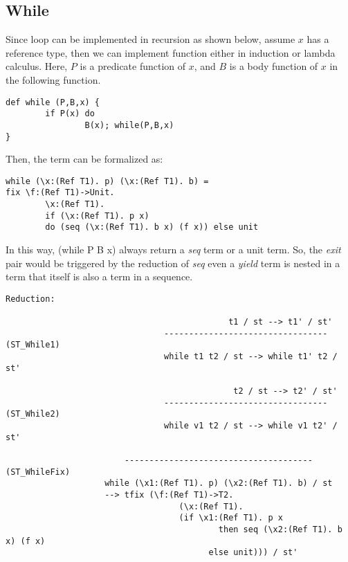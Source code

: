 \subsection{While}
Since \while loop can be implemented in recursion as shown below, assume $x$ has a reference type, then we can implement \while function either in induction or lambda calculus. Here, $P$ is a predicate function of $x$, and $B$ is a body function of $x$ in the following function.
\begin{lstlisting}
def while (P,B,x) {
		if P(x) do
				B(x); while(P,B,x)
}
\end{lstlisting}
Then, the \while term can be formalized as:
\begin{lstlisting}
while (\x:(Ref T1). p) (\x:(Ref T1). b) =
fix \f:(Ref T1)->Unit. 
		\x:(Ref T1). 
		if (\x:(Ref T1). p x) 
		do (seq (\x:(Ref T1). b x) (f x)) else unit
\end{lstlisting}
In this way, (while P B x) always return a \textit{seq} term or a unit term. So, the \textit{exit} pair would be triggered by the reduction of \textit{seq} even a \textit{yield} term is nested in a \while term that itself is also a term in a sequence.
\begin{lstlisting}
Reduction:

										     t1 / st --> t1' / st'
								--------------------------------- (ST_While1)
								while t1 t2 / st --> while t1' t2 / st'
								
											  t2 / st --> t2' / st'
								--------------------------------- (ST_While2)
								while v1 t2 / st --> while v1 t2' / st'
								
						-------------------------------------- (ST_WhileFix)
					while (\x1:(Ref T1). p) (\x2:(Ref T1). b) / st 
					--> tfix (\f:(Ref T1)->T2. 
								   (\x:(Ref T1). 
								   (if \x1:(Ref T1). p x
										   then seq (\x2:(Ref T1). b x) (f x)
									     else unit))) / st'
\end{lstlisting}


